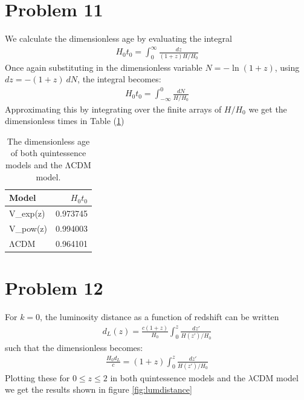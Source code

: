 \documentclass[reprint,english,notitlepage,nofootinbib]{revtex4-1}  %
\numberwithin{equation}{section}
\begin{document}
\section{Problem 11}
We calculate the dimensionless age by evaluating the integral
\begin{align}
    H_{0}t_{0} = \int_{0}^{\infty} \frac{dz}{(1+z)H/H_{0}}
\end{align}
Once again substituting in the dimensionless variable $N = -\ln(1+z)$, using
$dz = -(1+z)\ dN$, the integral becomes:
\begin{align}
    H_{0}t_{0} = \int_{-\infty}^{0} \frac{dN}{H/H_{0}}
\end{align}
Approximating this by integrating over the finite arrays
of $H/H_{0}$ we get the dimensionless times in Table
(\ref{tab:H0t0})
\begin{table}
	\begin{tabular}{|l|r|}
\hline
 Model   &     $H_0t_0$ \\
\hline
 V_{exp}(z)     & 0.973745 \\
 V_{pow}(z) & 0.994003 \\
 ΛCDM       & 0.964101 \\
\hline
\end{tabular}
	\caption{The dimensionless age of both quintessence models and the ΛCDM model.}
	\label{tab:H0t0}
\end{table}

\section{Problem 12}
For $k=0$, the luminosity distance as a function of redshift can be written
\begin{align}
    d_{L}(z) = \frac{c(1+z)}{H_{0}} \int_{0}^{z}
    \frac{dz'}{H(z')/H_{0}}
\end{align}
such that the dimensionless becomes:
\begin{align}
    \frac{H_{0}d_{L}}{c} = (1+z) \int_{0}^{z}
    \frac{dz'}{H(z')/H_{0}}
\end{align}
Plotting these for $0\leq z \leq 2$ in both quintessence
models and the $\lambda$CDM model we get the results
shown in figure \ref{fig:lumdistance}
\end{document}
